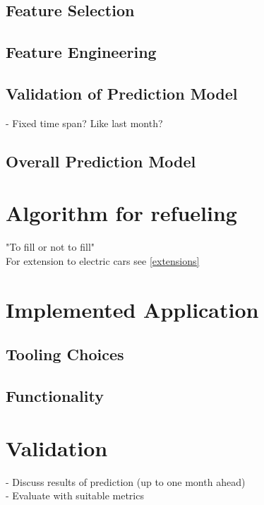 \documentclass[%
a4paper,
DIV12,
2.5headlines,
bigheadings,
titlepage,
openbib,
]{scrartcl}
\begin{document}
\subsection{Feature Selection}\label{feature-selection}



\subsection{Feature Engineering}\label{feature-engineering}



\subsection{Validation of Prediction
Model}\label{validation-of-prediction-model}
- Fixed time span? Like last month?


\subsection{Overall Prediction Model}\label{overall-prediction-model}

\section{Algorithm for refueling}
"To fill or not to fill"\cite{khuller2007fill}\\
For extension to electric cars see \ref{extensions}

\section{Implemented Application}\label{implemented-application}
\subsection{Tooling Choices}\label{tooling-choices}



\subsection{Functionality}\label{functionality}



\section{Validation}\label{validation}
- Discuss results of prediction (up to one month ahead)\\
- Evaluate with suitable metrics
\end{document}
